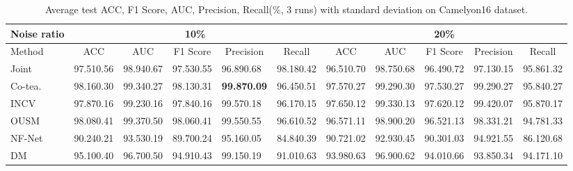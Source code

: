 \begin{table*}[]
\scriptsize
\centering
\caption{{Average test ACC, F1 Score, AUC, {Precision}, Recall(\%, 3 runs) with standard deviation on Camelyon16 dataset.}}
\label{table:objCamelyon}
\begin{tabular}{@{}lllllllllll@{}}
\toprule
\multicolumn{1}{c}{Noise ratio} & \multicolumn{5}{c}{10\%}                                                                                                                & \multicolumn{5}{c}{20\%}                                                                                                                \\ \midrule
Method                & \multicolumn{1}{c}{ACC} & \multicolumn{1}{c}{AUC} & \multicolumn{1}{c}{F1 Score} & \multicolumn{1}{c}{{Precision}} & \multicolumn{1}{c}{Recall} & \multicolumn{1}{c}{ACC} & \multicolumn{1}{c}{AUC} & \multicolumn{1}{c}{F1 Score} & \multicolumn{1}{c}{{Precision}} & \multicolumn{1}{c}{Recall} \\ \midrule
Joint                     & 97.510.56          & 98.940.67          & 97.530.55               & 96.890.68          & 98.180.42             & 96.510.70          & 98.750.68          & 96.490.72               & 97.130.15          & 95.861.32             \\
Co-tea.                     & 98.160.30          & 99.340.27          & 98.130.31               & \textbf{99.870.09} & 96.450.51             & 97.570.27          & 99.290.30          & 97.530.27               & 99.290.27          & 95.840.27             \\
INCV                            & 97.870.16          & 99.230.16          & 97.840.16               & 99.570.18          & 96.170.15             & 97.650.12          & 99.330.13          & 97.620.12               & 99.420.07          & 95.870.17             \\
OUSM                       & 98.080.41          & 99.370.50          & 98.060.41               & 99.550.55          & 96.610.52             & 96.571.11          & 98.900.20          & 96.521.13               & 98.331.21          & 94.781.33             \\
NF-Net                          & 90.240.21          & 93.530.19          & 89.700.24               & 95.160.05          & 84.840.39             & 90.721.02          & 92.930.45          & 90.301.03               & 94.921.55          & 86.120.68             \\
DM                       & 95.100.40          & 96.700.50          & 94.910.43               & 99.150.19          & 91.010.63             & 93.980.63          & 96.900.62          & 94.010.66               & 93.850.34          & 94.171.10             \\

\end{tabular}
\end{table*}
